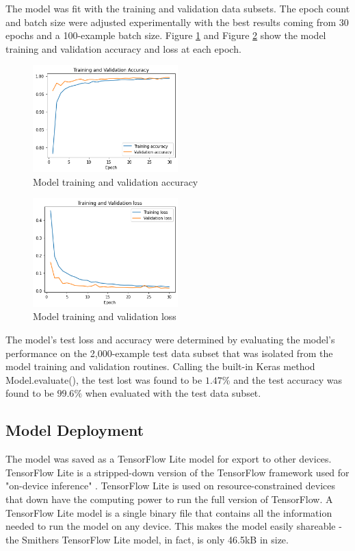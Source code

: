 \documentclass[conference]{IEEEtran}
\begin{document}
The model was fit with the training and validation data subsets.
The epoch count and batch size were adjusted experimentally
with the best results coming from 30 epochs and a 100-example batch size.
Figure \ref{fig:accuracy} and Figure \ref{fig:loss}
show the model training and validation accuracy and loss at each epoch.

\begin{figure}[htbp]
    \centerline{\includegraphics[width=0.5\textwidth]{figs/accuracy.png}}
    \caption{Model training and validation accuracy}
    \label{fig:accuracy}
\end{figure}
\begin{figure}[htbp]
    \centerline{\includegraphics[width=0.5\textwidth]{figs/loss.png}}
    \caption{Model training and validation loss}
    \label{fig:loss}
\end{figure}

The model's test loss and accuracy were determined
by evaluating the model's performance on the 2,000-example test data subset
that was isolated from the model training and validation routines.
Calling the built-in Keras method Model.evaluate(),
the test lost was found to be $1.47\%$ and the test accuracy was found to be $99.6\%$
when evaluated with the test data subset.

\subsection{Model Deployment}
The model was saved as a TensorFlow Lite model for export to other devices.
TensorFlow Lite is a stripped-down version of the TensorFlow framework
used for "on-device inference" \cite{tensorflowlite}.
TensorFlow Lite is used on resource-constrained devices that down have the computing power
to run the full version of TensorFlow.
A TensorFlow Lite model is a single binary file that contains all the information needed
to run the model on any device.
This makes the model easily shareable - the Smithers TensorFlow Lite model, in fact, 
is only 46.5kB in size.
\end{document}
